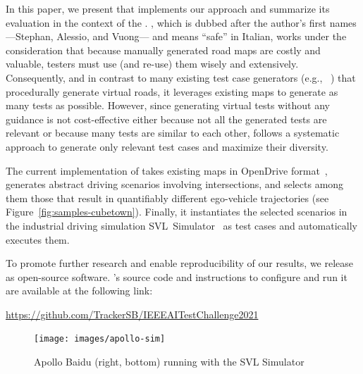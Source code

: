 \documentclass[conference]{IEEEtran}
\begin{document}
In this paper, we present \tool that implements our approach and summarize its evaluation in the context of the \challenge.
\tool, which is dubbed after the author's first names ---Stephan, Alessio, and Vuong--- and means ``safe'' in Italian, works under the consideration that because manually generated road maps are costly and valuable, testers must use (and re-use) them wisely and extensively. 
Consequently, and in contrast to many existing test case generators (e.g., ~\cite{DBLP:conf/icse/GambiMF19,DBLP:conf/icse/HuynhGF19,DBLP:conf/sigsoft/RiccioT20,DBLP:conf/issta/ZohdinasabRGT21,DBLP:conf/sbst/PanichellaGZR21}) that procedurally generate virtual roads, it leverages existing maps to generate as many tests as possible.
%
However, since generating virtual tests without any guidance is not cost-effective either because not all the generated tests are relevant or because many tests are similar to each other, \tool follows a systematic approach to generate only relevant test cases and maximize their diversity.

The current implementation of \tool takes existing maps in OpenDrive format~\cite{dupuis2010opendrive}, generates abstract driving scenarios involving intersections, and selects among them those that result in quantifiably different ego-vehicle trajectories (see Figure~\ref{fig:samples-cubetown}). Finally, it instantiates the selected scenarios in the industrial driving simulation SVL~Simulator~\cite{rong2020lgsvl} as test cases and automatically executes them.

To promote further research and enable reproducibility of our results, we release \tool as open-source software. \tool's source code and instructions to configure and run it are available at the following link:
\begin{center}
\href{https://github.com/TrackerSB/IEEEAITestChallenge2021}{https://github.com/TrackerSB/IEEEAITestChallenge2021}
\end{center}

\begin{figure}[tp]
  \centering
    \texttt{[image: images/apollo-sim]}
  \caption{Apollo Baidu (right, bottom) running with the SVL Simulator~\cite{svl-website}}
  \label{fig:apollosim}
\end{figure}
\end{document}
